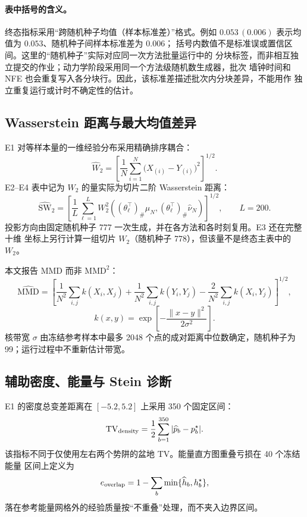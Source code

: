 \documentclass[11pt,a4paper]{article}
\begin{document}
\paragraph{表中括号的含义。}
终态指标采用“跨随机种子均值（样本标准差）”格式。例如
$0.053\,(0.006)$ 表示均值为 $0.053$、随机种子间样本标准差为 $0.006$；
括号内数值不是标准误或置信区间。这里的“随机种子”实际对应同一次方法批量运行中的
分块标签，而非相互独立提交的作业；动力学阶段采用同一个方法级随机数生成器，批次
墙钟时间和 NFE 也会重复写入各分块行。因此，该标准差描述批次内分块差异，不能用作
独立重复运行或计时不确定性的估计。

\subsection{Wasserstein 距离与最大均值差异}

E1 对等样本量的一维经验分布采用精确排序耦合：
\begin{equation}
 \widehat W_2
 =\left[
 \frac1N\sum_{i=1}^{N}\bigl(X_{(i)}-Y_{(i)}\bigr)^2
 \right]^{1/2}.
\end{equation}
E2--E4 表中记为 $W_2$ 的量实际为切片二阶 Wasserstein 距离：
\begin{equation}
 \widehat{\mathrm{SW}}_2
 =\left[
 \frac1L\sum_{\ell=1}^{L}
 W_2^2\!\left(
  (\theta_\ell^\top)_\#\widehat\mu_N,
  (\theta_\ell^\top)_\#\widehat\nu_N
 \right)
 \right]^{1/2},
 \qquad L=200.
\end{equation}
投影方向由固定随机种子 777 一次生成，并在各方法和各时刻复用。E3 还在完整十维
坐标上另行计算一组切片 $W_2$（随机种子 778），但该量不是终态主表中的 $W_2$。

本文报告 MMD 而非 $\mathrm{MMD}^2$：
\begin{equation}
 \widehat{\mathrm{MMD}}
 =
 \left[
 \frac1{N^2}\sum_{i,j}k(X_i,X_j)
 +\frac1{N^2}\sum_{i,j}k(Y_i,Y_j)
 -\frac2{N^2}\sum_{i,j}k(X_i,Y_j)
 \right]^{1/2},
\end{equation}
\begin{equation}
 k(x,y)=
 \exp\!\left[-\frac{\|x-y\|^2}{2\sigma^2}\right].
\end{equation}
核带宽 $\sigma$ 由冻结参考样本中最多 2048 个点的成对距离中位数确定，随机种子为
99；运行过程中不重新估计带宽。

\subsection{辅助密度、能量与 Stein 诊断}

E1 的密度总变差距离在 $[-5.2,5.2]$ 上采用 350 个固定区间：
\begin{equation}
 \mathrm{TV}_{\rm density}
 =\frac12\sum_{b=1}^{350}|\widehat p_b-p_b^\star|.
\end{equation}
该指标不同于仅使用左右两个势阱的盆地 TV。能量直方图重叠亏损在 40 个冻结能量
区间上定义为
\begin{equation}
 e_{\rm overlap}
 =1-\sum_b\min\{\widehat h_b,h_b^\star\},
\end{equation}
落在参考能量网格外的经验质量按“不重叠”处理，而不夹入边界区间。
\end{document}
